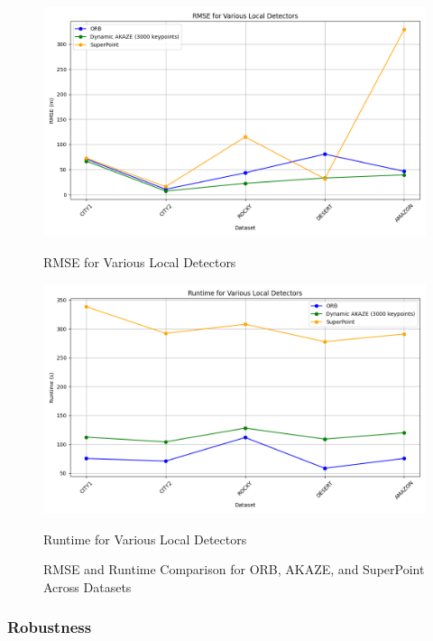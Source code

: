 \begin{figure}[H]
    \centering
    \begin{minipage}{0.45\textwidth}
        \centering
        \includegraphics[width=\textwidth]{./Chapter 4/testresults/rmse_detectors.png}
        \caption{RMSE for Various Local Detectors}
        \label{fig:rmse_detectors}
    \end{minipage}\hfill
    \begin{minipage}{0.45\textwidth}
        \centering
        \includegraphics[width=\textwidth]{./Chapter 4/testresults/runtime_detectors.png}
        \caption{Runtime for Various Local Detectors}
        \label{fig:runtime_detectors}
    \end{minipage}
    \caption{RMSE and Runtime Comparison for ORB, AKAZE, and SuperPoint Across Datasets}
    \label{fig:rmse_runtime_detectors}
\end{figure}


\subsubsection{Robustness}

